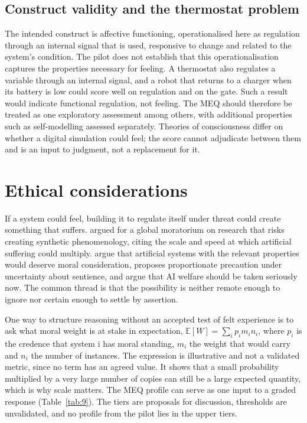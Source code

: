 \documentclass[twoside,11pt]{article}
\begin{document}
\subsection{Construct validity and the thermostat problem}\label{sec:7.4}

The intended construct is affective functioning, operationalised here as regulation through an internal signal that is used, responsive to change and related to the system's condition. The pilot does not establish that this operationalisation captures the properties necessary for feeling. A thermostat also regulates a variable through an internal signal, and a robot that returns to a charger when its battery is low could score well on regulation and on the gate. Such a result would indicate functional regulation, not feeling. The MEQ should therefore be treated as one exploratory assessment among others, with additional properties such as self-modelling assessed separately. Theories of consciousness differ on whether a digital simulation could feel; the score cannot adjudicate between them and is an input to judgment, not a replacement for it.

\section{Ethical considerations}\label{sec:8}

If a system could feel, building it to regulate itself under threat could create something that suffers. \citet{metzinger2021} argued for a global moratorium on research that risks creating synthetic phenomenology, citing the scale and speed at which artificial suffering could multiply. \citet{schwitzgebel2015} argue that artificial systems with the relevant properties would deserve moral consideration, \citet{birch2024} proposes proportionate precaution under uncertainty about sentience, and \citet{long2024} argue that AI welfare should be taken seriously now. The common thread is that the possibility is neither remote enough to ignore nor certain enough to settle by assertion.

One way to structure reasoning without an accepted test of felt experience is to ask what moral weight is at stake in expectation, $\mathbb{E}[W]=\sum_i p_i m_i n_i$, where $p_{i}$ is the credence that system i has moral standing, $m_{i}$ the weight that would carry and $n_{i}$ the number of instances. The expression is illustrative and not a validated metric, since no term has an agreed value. It shows that a small probability multiplied by a very large number of copies can still be a large expected quantity, which is why scale matters. The MEQ profile can serve as one input to a graded response (Table~\ref{tab:9}). The tiers are proposals for discussion, thresholds are unvalidated, and no profile from the pilot lies in the upper tiers.
\end{document}
